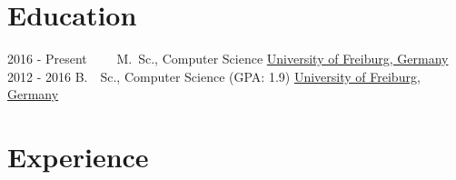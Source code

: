 \documentclass[letterpaper]{twentysecondcv} %
\begin{document}
\makeprofile %

\section{Education}

\begin{twenty} %
	\twentyitem
    	{2016 - Present~~~~}
        {}
        {M.~Sc., Computer Science}
        {\href{https://www.uni-freiburg.de/}{University of Freiburg, Germany}}
        {}
        {}
	\twentyitem
    	{2012 - 2016}
		{}
        {B.~~Sc., Computer Science \textnormal{(GPA: 1.9)}}
        {\href{https://www.uni-freiburg.de/}{University of Freiburg, Germany}}
        {}
        {}
\end{twenty}


\section{Experience}
\end{document}

